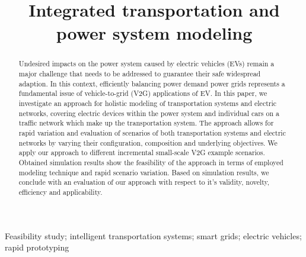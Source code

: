\title{Integrated transportation and power system modeling}

\author{
	\and
}

\maketitle

\begin{abstract}
Undesired impacts on the power system caused by electric vehicles (EVs) remain a major challenge that needs to be addressed to guarantee their safe widespread adaption. In this context, efficiently balancing power demand power grids represents a fundamental issue of vehicle-to-grid (V2G) applications of EV. In this paper, we investigate an approach for holistic modeling of transportation systems and electric networks, covering electric devices within the power system and individual cars on a traffic network which make up the transportation system. The approach allows for rapid variation and evaluation of scenarios of both transportation systems and electric networks by varying their configuration, composition and underlying objectives. We apply our approach to different incremental small-scale V2G example scenarios. Obtained simulation results show the feasibility of the approach in terms of employed modeling technique and rapid scenario variation. Based on simulation results, we conclude with an evaluation of our approach with respect to it's validity, novelty, efficiency and applicability.
\end{abstract}

\begin{keywords}
Feasibility study; intelligent transportation systems; smart grids; electric vehicles; rapid prototyping
\end{keywords}